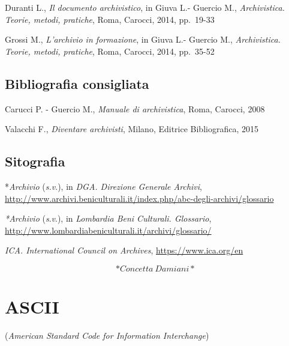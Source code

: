 \documentclass[
  b5paper,
  twoside,
  12pt,
  chapterprefix=false,
  bibliography=totocnumbered,
  parskip=false]{scrbook}
\begin{document}
Duranti L., \emph{Il documento archivistico}, in Giuva L.- Guercio M.,
\emph{Archivistica. Teorie, metodi, pratiche}, Roma, Carocci, 2014, pp.~19-33

Grossi M., \emph{L'archivio in formazione}, in Giuva L.- Guercio M.,
\emph{Archivistica. Teorie, metodi, pratiche}, Roma, Carocci, 2014, pp.~35-52

\hypertarget{bibliografia-consigliata}{%
\section*{Bibliografia consigliata}\label{bibliografia-consigliata}}

Carucci P. - Guercio M., \emph{Manuale di archivistica}, Roma, Carocci, 2008

Valacchi F., \emph{Diventare archivisti}, Milano, Editrice Bibliografica,
2015

\hypertarget{sitografia}{%
\section*{Sitografia}\label{sitografia}}

*\emph{Archivio} (\emph{s.v}.), in \emph{DGA. Direzione Generale Archivi},
\url{http://www.archivi.beniculturali.it/index.php/abc-degli-archivi/glossario}

\emph{*Archivio} (\emph{s}.\emph{v}.), in \emph{Lombardia Beni Culturali. Glossario},
\url{http://www.lombardiabeniculturali.it/archivi/glossario/}

\emph{ICA. International Council on Archives},
\url{https://www.ica.org/en}

\[*Concetta~Damiani*\]

\hypertarget{ascii}{%
\chapter{ASCII}\label{ascii}}

(\emph{American Standard Code for Information Interchange})
\end{document}
